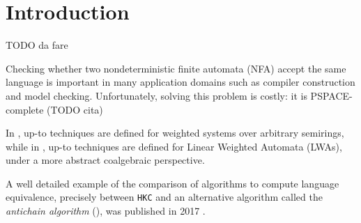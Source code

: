 \section{Introduction}
\label{sec:intro}
TODO da fare

Checking whether two nondeterministic finite automata (NFA) accept the same
language is important in many application domains such as compiler construction and model checking. 
Unfortunately, solving this problem is costly: it is
PSPACE-complete (TODO cita) 

In \cite{DBLP:journals/corr/Bonchi0K17}, up-to techniques are defined for
weighted systems over arbitrary semirings, while in \cite{BONCHI201277}, up-to techniques
are defined for Linear Weighted Automata (LWAs), under a more abstract coalgebraic perspective.

A well detailed example of the comparison of algorithms to compute 
language equivalence, precisely between \texttt{HKC} and an alternative
algorithm called the \textit{antichain algorithm} (\cite{de2006antichains}),
was published in 2017 \cite{fu2017equivalence}.
